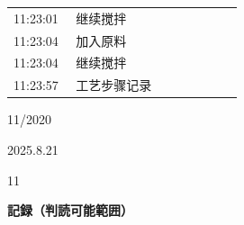 \documentclass[UTF8,10pt,a4paper,fontset=fandol]{ctexart}
\newcommand{\fieldvalue}[1]{#1}
\newcommand{\handwritten}[1]{#1}
\begin{document}
\begin{tabular}{p{0.25\linewidth}p{0.67\linewidth}}
\fieldvalue{11:23:01} &
\fieldvalue{继续搅拌} \\

\fieldvalue{11:23:04} &
\fieldvalue{加入原料} \\

\fieldvalue{11:23:04} &
\fieldvalue{继续搅拌} \\

\fieldvalue{11:23:57} &
\fieldvalue{工艺步骤记录} \\
\end{tabular}

\handwritten{11/2020}

\handwritten{2025.8.21}

\handwritten{11}

\noindent

\newpage

\begin{center}
\small
\textbf{記録（判読可能範囲）}
\end{center}
\end{document}
